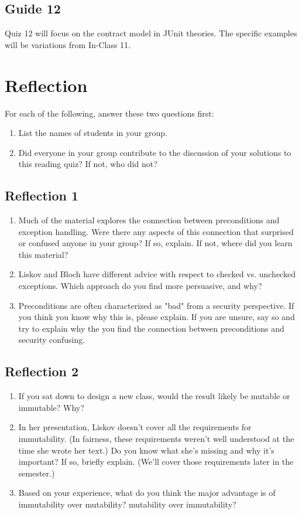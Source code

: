 \documentclass[11pt]{article}
\begin{document}
\subsection{Guide 12}
\label{sec:org822f6d8}
Quiz 12 will focus on the contract model in JUnit theories. The specific examples will be variations from In-Class 11.

\section{Reflection}
\label{sec:org7c316ef}

For each of the following, answer these two questions first:
\begin{enumerate}
\item List the names of students in your group.
\item Did everyone in your group contribute to the discussion of your solutions to this reading quiz? If not, who did not?
\end{enumerate}

\subsection{Reflection 1}
\label{sec:org9754d14}
\begin{enumerate}
\item Much of the material explores the connection between preconditions and exception handling. Were there any aspects of this connection that surprised or confused anyone in your group? If so, explain. If not, where did you learn this material?
\item Liskov and Bloch have different advice with respect to checked vs. unchecked exceptions. Which approach do you find more persuasive, and why?
\item Preconditions are often characterized as "bad" from a security perspective. If you think you know why this is, please explain. If you are unsure, say so and try to explain why the you find the connection between preconditions and security confusing.
\end{enumerate}


\subsection{Reflection 2}
\label{sec:orga3b729a}

\begin{enumerate}
\item If you sat down to design a new class, would the result likely be mutable or immutable? Why?
\item In her presentation, Liskov doesn't cover all the requirements for immutability. (In fairness, these requirements weren't well understood at the time she wrote her text.) Do you know what she's missing and why it's important? If so, briefly explain. (We'll cover those requirements later in the semester.)
\item Based on your experience, what do you think the major advantage is of immutability over mutability? mutability over immutability?
\end{enumerate}
\end{document}
